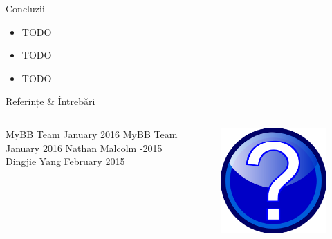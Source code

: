 \documentclass[9pt]{beamer}
\begin{document}
\begin{frame}{Concluzii}
	\begin{itemize}
	    \item TODO
	    \vskip10pt
	    \item TODO
	    \vskip10pt
	    \item TODO
    \end{itemize}
\end{frame}

\begin{frame}{Referințe \& Întrebări}
  \begin{columns}
    \begin{column}[c]{0.70\textwidth}
        \begin{thebibliography}{10}    
        \beamertemplatebookbibitems
            MyBB Team
            \newblock January 2016
        \beamertemplatearticlebibitems
            MyBB Team
            \newblock January 2016
        \beamertemplatearticlebibitems
            Nathan Malcolm
            -2015
        \beamertemplatearticlebibitems
            Dingjie Yang
            \newblock February 2015
        \end{thebibliography}
    \end{column}

    \begin{column}[c]{0.30\textwidth}
      \begin{figure}
        \includegraphics[scale=0.2]{figures/question}
      \end{figure}
    \end{column}
  \end{columns}
\end{frame}
\end{document}
